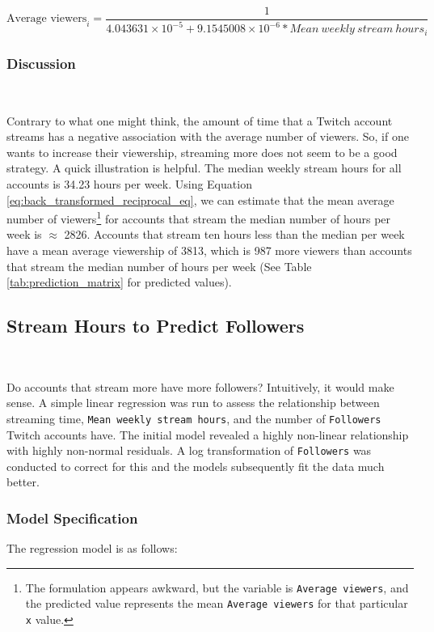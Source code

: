\documentclass[12pt]{article}
\begin{document}
\begin{equation}
\text{Average viewers}_i = \dfrac{1}{4.043631\times10^{-5} + 9.1545008\times10^{-6} \ast Mean\ weekly\ stream\ hours_{i}} \label{eq:back_transformed_reciprocal_eq}
\end{equation}

\subsubsection{Discussion}\

Contrary to what one might think, the amount of time that a Twitch account streams has a negative association with the average number of viewers. So, if one wants to increase their viewership, streaming more does not seem to be a good strategy. A quick illustration is helpful. The median weekly stream hours for all accounts is 34.23 hours per week. Using Equation \ref{eq:back_transformed_reciprocal_eq}, we can estimate that the mean average number of viewers\footnote{The formulation appears awkward, but the variable is \texttt{Average viewers}, and the predicted value represents the mean \texttt{Average viewers} for that particular \texttt{x} value.} for accounts that stream the median number of hours per week is $\approx$ 2826. Accounts that stream ten hours less than the median per week have a mean average viewership of 3813, which is 987 more viewers than accounts that stream the median number of hours per week (See Table \ref{tab:prediction_matrix} for predicted values). 

\subsection{Stream Hours to Predict Followers}\

Do accounts that stream more have more followers? Intuitively, it would make sense. A simple linear regression was run to assess the relationship between streaming time, \texttt{Mean weekly stream hours}, and the number of \texttt{Followers} Twitch accounts have. The initial model revealed a highly non-linear relationship with highly non-normal residuals. A log transformation of \texttt{Followers} was conducted to correct for this and the models subsequently fit the data much better.

\subsubsection{Model Specification}
The regression model is as follows:
\end{document}

